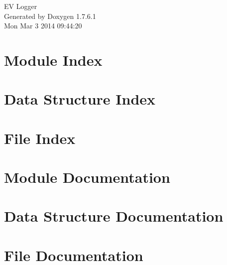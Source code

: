 \documentclass[a4paper]{book}
\begin{document}
\hypersetup{pageanchor=false,citecolor=blue}
\begin{titlepage}
\vspace*{7cm}
\begin{center}
{\Large \-E\-V \-Logger }\\
\vspace*{1cm}
{\large \-Generated by Doxygen 1.7.6.1}\\
\vspace*{0.5cm}
{\small Mon Mar 3 2014 09:44:20}\\
\end{center}
\end{titlepage}
\clearemptydoublepage
{}
\tableofcontents
\clearemptydoublepage
{}
\hypersetup{pageanchor=true,citecolor=blue}
\chapter{\-Module \-Index}

\chapter{\-Data \-Structure \-Index}

\chapter{\-File \-Index}

\chapter{\-Module \-Documentation}



\chapter{\-Data \-Structure \-Documentation}


\chapter{\-File \-Documentation}



















\printindex
\end{document}
